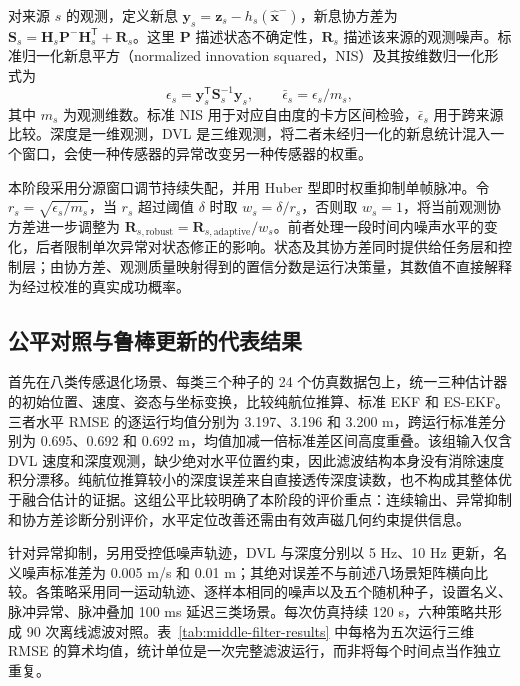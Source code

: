 对来源 $s$ 的观测，定义新息 $\boldsymbol{y}_{s}=\boldsymbol{z}_{s}-h_s(\hat{\boldsymbol{x}}^{-})$，新息协方差为 $\boldsymbol{S}_{s}=\boldsymbol{H}_{s}\boldsymbol{P}^{-}\boldsymbol{H}_{s}^{\mathsf T}+\boldsymbol{R}_{s}$。这里 $\boldsymbol{P}$ 描述状态不确定性，$\boldsymbol{R}_{s}$ 描述该来源的观测噪声。标准归一化新息平方（normalized innovation squared，NIS）及其按维数归一化形式为
\begin{equation}
 \epsilon_s=\boldsymbol{y}_{s}^{\mathsf T}\boldsymbol{S}_{s}^{-1}\boldsymbol{y}_{s},
 \qquad \bar\epsilon_s=\epsilon_s/m_s,
\end{equation}
其中 $m_s$ 为观测维数。标准 NIS 用于对应自由度的卡方区间检验，$\bar\epsilon_s$ 用于跨来源比较\cite{barshalom2001estimation}。深度是一维观测，DVL 是三维观测，将二者未经归一化的新息统计混入一个窗口，会使一种传感器的异常改变另一种传感器的权重。

本阶段采用分源窗口调节持续失配，并用 Huber 型即时权重抑制单帧脉冲。令 $r_s=\sqrt{\epsilon_s/m_s}$，当 $r_s$ 超过阈值 $\delta$ 时取 $w_s=\delta/r_s$，否则取 $w_s=1$，将当前观测协方差进一步调整为 $\boldsymbol{R}_{s,\mathrm{robust}}=\boldsymbol{R}_{s,\mathrm{adaptive}}/w_s$。前者处理一段时间内噪声水平的变化，后者限制单次异常对状态修正的影响。状态及其协方差同时提供给任务层和控制层；由协方差、观测质量映射得到的置信分数是运行决策量，其数值不直接解释为经过校准的真实成功概率。

\subsection{公平对照与鲁棒更新的代表结果}

首先在八类传感退化场景、每类三个种子的 24 个仿真数据包上，统一三种估计器的初始位置、速度、姿态与坐标变换，比较纯航位推算、标准 EKF 和 ES-EKF。三者水平 RMSE 的逐运行均值分别为 3.197、3.196 和 3.200 m，跨运行标准差分别为 0.695、0.692 和 0.692 m，均值加减一倍标准差区间高度重叠。该组输入仅含 DVL 速度和深度观测，缺少绝对水平位置约束，因此滤波结构本身没有消除速度积分漂移。纯航位推算较小的深度误差来自直接透传深度读数，也不构成其整体优于融合估计的证据。这组公平比较明确了本阶段的评价重点：连续输出、异常抑制和协方差诊断分别评价，水平定位改善还需由有效声磁几何约束提供信息。

针对异常抑制，另用受控低噪声轨迹，DVL 与深度分别以 5 Hz、10 Hz 更新，名义噪声标准差为 0.005 m/s 和 0.01 m；其绝对误差不与前述八场景矩阵横向比较。各策略采用同一运动轨迹、逐样本相同的噪声以及五个随机种子，设置名义、脉冲异常、脉冲叠加 100 ms 延迟三类场景。每次仿真持续 120 s，六种策略共形成 90 次离线滤波对照。表~\ref{tab:middle-filter-results} 中每格为五次运行三维 RMSE 的算术均值，统计单位是一次完整滤波运行，而非将每个时间点当作独立重复。

